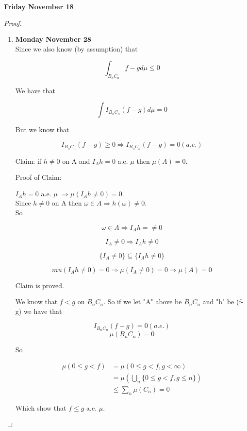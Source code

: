 \documentclass[11pt,fleqn]{book} %
\begin{document}
\textbf{Friday November 18}\\
\begin{proof}

\begin{enumerate}
	
	\item
\textbf{Monday November 28}\\

Since we also know (by assumption) that 

		$$\int_{B_n C_n} f - g d\mu \leq 0 $$

We have that 

		$$ \int I_{B_n C_n} (f-g) d\mu = 0$$

But we know that

		$$I_{B_n C_n} (f-g) \geq 0 \Rightarrow  I_{B_n C_n} (f-g) = 0 (a.e.)$$

Claim: if $h \neq 0$ on A and $I_A h = 0$ a.e. $\mu$ then $\mu(A) = 0$. 

		Proof of Claim: 

		$I_A h = 0$ a.e. $\mu$ $\Rightarrow \mu(I_A h \neq 0) = 0$. \\

		Since $h \neq 0$ on A then $\omega \in A \Rightarrow h(\omega) \neq 0$.\\

		So 

				$$\omega \in A \Rightarrow I_A h =\neq 0 $$

				$$ I_A \neq 0 \Rightarrow I_A h \neq 0 $$

				$$\{I_A \neq 0\} \subseteq \{I_A h \neq 0\} $$

				$$mu(I_A h \neq 0) = 0 \Rightarrow \mu(I_A \neq 0) = 0 \Rightarrow \mu(A) = 0$$

		Claim is proved. 

We know that $f < g $ on $B_nC_n$. So if we let "A" above be $B_n C_n$ and "h" be (f-g) we have that

		$$I_{B_n C_n}(f-g) = 0 (a.e.)$$
		$$\mu(B_n C_n) = 0 $$

So

		\begin{align*}
			\mu(0 \leq g < f) &= \mu( 0 \leq g < f, g < \infty)\\
					&= \mu(\bigcup_n \{0 \leq g < f , g \leq n\})\\
					&\leq \sum_n \mu(C_n) = 0
		\end{align*} 


Which show that $f \leq g$ a.e. $\mu$.\\



\end{enumerate}
\end{proof}
\end{document}
